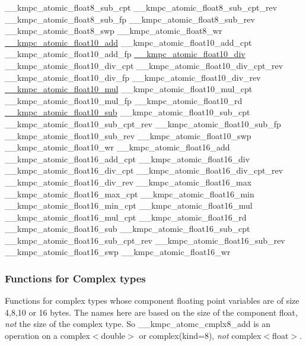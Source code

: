 \begin{DoxyCode}
\_\_kmpc\_atomic\_float8\_sub\_cpt
\_\_kmpc\_atomic\_float8\_sub\_cpt\_rev
\_\_kmpc\_atomic\_float8\_sub\_fp
\_\_kmpc\_atomic\_float8\_sub\_rev
\_\_kmpc\_atomic\_float8\_swp
\_\_kmpc\_atomic\_float8\_wr
\hyperlink{kmp__atomic_8h_a9f441825b60fdbf38b4f584e93908ddb}{\_\_kmpc\_atomic\_float10\_add}
\_\_kmpc\_atomic\_float10\_add\_cpt
\_\_kmpc\_atomic\_float10\_add\_fp
\hyperlink{kmp__atomic_8h_aeb5254f5f5c849948bcd4a7307291f42}{\_\_kmpc\_atomic\_float10\_div}
\_\_kmpc\_atomic\_float10\_div\_cpt
\_\_kmpc\_atomic\_float10\_div\_cpt\_rev
\_\_kmpc\_atomic\_float10\_div\_fp
\_\_kmpc\_atomic\_float10\_div\_rev
\hyperlink{kmp__atomic_8h_a1129729ff46010b600cf2dc55870fd8b}{\_\_kmpc\_atomic\_float10\_mul}
\_\_kmpc\_atomic\_float10\_mul\_cpt
\_\_kmpc\_atomic\_float10\_mul\_fp
\_\_kmpc\_atomic\_float10\_rd
\hyperlink{kmp__atomic_8h_a3453a5d1175a6e6445848cf2eb038069}{\_\_kmpc\_atomic\_float10\_sub}
\_\_kmpc\_atomic\_float10\_sub\_cpt
\_\_kmpc\_atomic\_float10\_sub\_cpt\_rev
\_\_kmpc\_atomic\_float10\_sub\_fp
\_\_kmpc\_atomic\_float10\_sub\_rev
\_\_kmpc\_atomic\_float10\_swp
\_\_kmpc\_atomic\_float10\_wr
\_\_kmpc\_atomic\_float16\_add
\_\_kmpc\_atomic\_float16\_add\_cpt
\_\_kmpc\_atomic\_float16\_div
\_\_kmpc\_atomic\_float16\_div\_cpt
\_\_kmpc\_atomic\_float16\_div\_cpt\_rev
\_\_kmpc\_atomic\_float16\_div\_rev
\_\_kmpc\_atomic\_float16\_max
\_\_kmpc\_atomic\_float16\_max\_cpt
\_\_kmpc\_atomic\_float16\_min
\_\_kmpc\_atomic\_float16\_min\_cpt
\_\_kmpc\_atomic\_float16\_mul
\_\_kmpc\_atomic\_float16\_mul\_cpt
\_\_kmpc\_atomic\_float16\_rd
\_\_kmpc\_atomic\_float16\_sub
\_\_kmpc\_atomic\_float16\_sub\_cpt
\_\_kmpc\_atomic\_float16\_sub\_cpt\_rev
\_\_kmpc\_atomic\_float16\_sub\_rev
\_\_kmpc\_atomic\_float16\_swp
\_\_kmpc\_atomic\_float16\_wr
\end{DoxyCode}


\subsubsection*{Functions for Complex types }

Functions for complex types whose component floating point variables are of size 4,8,10 or 16 bytes. The names here are based on the size of the component float, {\itshape not} the size of the complex type. So {\ttfamily \-\_\-\-\_\-kmpc\-\_\-atomc\-\_\-cmplx8\-\_\-add} is an operation on a {\ttfamily complex$<$double$>$} or {\ttfamily complex(kind=8)}, {\itshape not} {\ttfamily complex$<$float$>$}.


